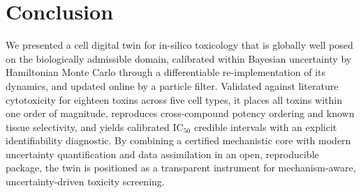 \documentclass[journal]{IEEEtran}
\begin{document}
\section{Conclusion}
\label{sec:conclusion}

We presented a cell digital twin for in-silico toxicology that is globally well
posed on the biologically admissible domain, calibrated within Bayesian
uncertainty by Hamiltonian Monte Carlo through a differentiable re-implementation
of its dynamics, and updated online by a particle filter. Validated against
literature cytotoxicity for eighteen toxins across five cell types, it places all
toxins within one order of magnitude, reproduces cross-compound potency ordering
and known tissue selectivity, and yields calibrated IC$_{50}$ credible intervals
with an explicit identifiability diagnostic. By combining a certified mechanistic
core with modern uncertainty quantification and data assimilation in an open,
reproducible package, the twin is positioned as a transparent instrument for
mechanism-aware, uncertainty-driven toxicity screening.
\end{document}
